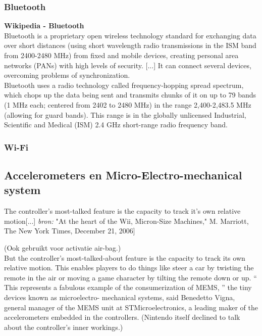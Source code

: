 \documentclass[11pt]{article}
\begin{document}
\subsubsection{Bluetooth}

\textbf{Wikipedia - Bluetooth}\\
Bluetooth is a proprietary open wireless technology standard for exchanging data over short distances (using short wavelength radio transmissions in the ISM band from 2400-2480 MHz) from fixed and mobile devices, creating personal area networks (PANs) with high levels of security. [...] It can connect several devices, overcoming problems of synchronization.
\\
Bluetooth uses a radio technology called frequency-hopping spread spectrum, which chops up the data being sent and transmits chunks of it on up to 79 bands (1 MHz each; centered from 2402 to 2480 MHz) in the range 2,400-2,483.5 MHz (allowing for guard bands). This range is in the globally unlicensed Industrial, Scientific and Medical (ISM) 2.4 GHz short-range radio frequency band.

\subsubsection{Wi-Fi}




\subsection{Accelerometers en Micro-Electro-mechanical system}

\begin{flushright}[...]The controller's most-talked feature is the capacity to track it's own relative motion[...] \textit{bron:} "At the heart of the Wii, Micron-Size Machines," M. Marriott, The New York Times, December 21, 2006]
\end{flushright}

(Ook gebruikt voor activatie air-bag.)
\\

But the controller's most-talked-about feature is the capacity to track its own relative motion. This enables players to do things like steer a car by twisting the remote in the air or moving a game character by tilting the remote down or up. `` This represents a fabulous example of the consumerization of MEMS, '' the tiny devices known as microelectro- mechanical systems, said Benedetto Vigna, general manager of the MEMS unit at STMicroelectronics, a leading maker of the accelerometers embedded in the controllers. (Nintendo itself declined to talk about the controller's inner workings.)\\
\end{document}
